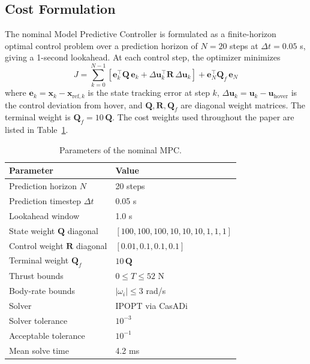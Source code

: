 \documentclass[conference]{IEEEtran}
\begin{document}
\subsection{Cost Formulation}
The nominal Model Predictive Controller is formulated as a finite-horizon optimal control problem over a prediction horizon of $N = 20$ steps at $\Delta t = 0.05$ s, giving a 1-second lookahead. At each control step, the optimizer minimizes
\begin{equation}
J = \sum_{k=0}^{N-1} \left[ \mathbf{e}_k^\top \mathbf{Q}\, \mathbf{e}_k + \Delta \mathbf{u}_k^\top \mathbf{R}\, \Delta \mathbf{u}_k \right] + \mathbf{e}_N^\top \mathbf{Q}_f\, \mathbf{e}_N
\end{equation}
where $\mathbf{e}_k = \mathbf{x}_k - \mathbf{x}_{\text{ref},k}$ is the state tracking error at step $k$, $\Delta \mathbf{u}_k = \mathbf{u}_k - \mathbf{u}_{\text{hover}}$ is the control deviation from hover, and $\mathbf{Q}, \mathbf{R}, \mathbf{Q}_f$ are diagonal weight matrices. The terminal weight is $\mathbf{Q}_f = 10\,\mathbf{Q}$. The cost weights used throughout the paper are listed in Table~\ref{tab:mpc}.

\begin{table}[t]
\centering
\caption{Parameters of the nominal MPC.}
\label{tab:mpc}
\begin{tabular}{ll}
\toprule
Parameter & Value \\
\midrule
Prediction horizon $N$ & 20 steps \\
Prediction timestep $\Delta t$ & 0.05 s \\
Lookahead window & 1.0 s \\
State weight $\mathbf{Q}$ diagonal & $[100, 100, 100, 10, 10, 10, 1, 1, 1]$ \\
Control weight $\mathbf{R}$ diagonal & $[0.01, 0.1, 0.1, 0.1]$ \\
Terminal weight $\mathbf{Q}_f$ & $10\,\mathbf{Q}$ \\
Thrust bounds & $0 \leq T \leq 52$ N \\
Body-rate bounds & $|\omega_i| \leq 3$ rad/s \\
Solver & IPOPT via CasADi \\
Solver tolerance & $10^{-3}$ \\
Acceptable tolerance & $10^{-1}$ \\
Mean solve time & 4.2 ms \\
\bottomrule
\end{tabular}
\end{table}
\end{document}
